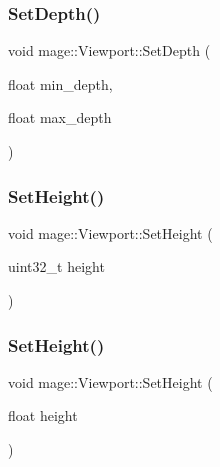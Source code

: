 \hypertarget{structmage_1_1_viewport_ae651a5c166c83aae67db6181d356f966}{}\label{structmage_1_1_viewport_ae651a5c166c83aae67db6181d356f966} 
\subsubsection{\texorpdfstring{Set\+Depth()}{SetDepth()}}
{\footnotesize\ttfamily void mage\+::\+Viewport\+::\+Set\+Depth (\begin{DoxyParamCaption}\item[{float}]{min\+\_\+depth,  }\item[{float}]{max\+\_\+depth }\end{DoxyParamCaption})\hspace{0.3cm}{\ttfamily [noexcept]}}

\hypertarget{structmage_1_1_viewport_a9e7f87ae37470e5a4f75f46040476609}{}\label{structmage_1_1_viewport_a9e7f87ae37470e5a4f75f46040476609} 
\subsubsection{\texorpdfstring{Set\+Height()}{SetHeight()}\hspace{0.1cm}{\footnotesize\ttfamily [1/2]}}
{\footnotesize\ttfamily void mage\+::\+Viewport\+::\+Set\+Height (\begin{DoxyParamCaption}\item[{uint32\+\_\+t}]{height }\end{DoxyParamCaption})\hspace{0.3cm}{\ttfamily [noexcept]}}

\hypertarget{structmage_1_1_viewport_ae68911aa2a5f53457ec18ff4dc177530}{}\label{structmage_1_1_viewport_ae68911aa2a5f53457ec18ff4dc177530} 
\subsubsection{\texorpdfstring{Set\+Height()}{SetHeight()}\hspace{0.1cm}{\footnotesize\ttfamily [2/2]}}
{\footnotesize\ttfamily void mage\+::\+Viewport\+::\+Set\+Height (\begin{DoxyParamCaption}\item[{float}]{height }\end{DoxyParamCaption})\hspace{0.3cm}{\ttfamily [noexcept]}}


